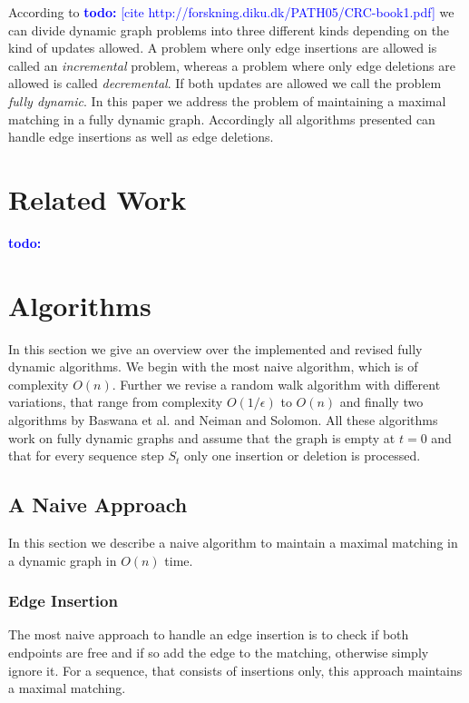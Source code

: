 \documentclass{article}      %
\newcommand\todo[1]{\textcolor{blue}{\textbf{todo: }#1}}
\begin{document}
According to \todo{[cite http://forskning.diku.dk/PATH05/CRC-book1.pdf]} we can divide dynamic graph problems into three different kinds depending on the kind of updates allowed. A problem where only edge insertions are allowed is called an \emph{incremental} problem, whereas a problem where only edge deletions are allowed is called \emph{decremental}. If both updates are allowed we call the problem \emph{fully dynamic}. In this paper we address the problem of maintaining a maximal matching in a fully dynamic graph. Accordingly all algorithms presented can handle edge insertions as well as edge deletions.

\pagebreak
\section{Related Work}
\label{sec:rel}

\todo{}

\pagebreak
\section{Algorithms}
\label{sec:algorithms}

In this section we give an overview over the implemented and revised fully dynamic algorithms. We begin with the most naive algorithm, which is of complexity $O(n)$. Further we revise a random walk algorithm with different variations, that range from complexity $O(1/\epsilon)$ to $O(n)$ and finally two algorithms by Baswana et al. and Neiman and Solomon. All these algorithms work on fully dynamic graphs and assume that the graph is empty at $t=0$ and that for every sequence step $S_t$ only one insertion or deletion is processed.

\subsection{A Naive Approach}
\label{sec:naive}

In this section we describe a naive algorithm to maintain a maximal matching in a dynamic graph in $O(n)$ time.

\subsubsection{Edge Insertion}
\label{sec:naive-edge-in}

The most naive approach to handle an edge insertion is to check if both endpoints are free and if so add the edge to the matching, otherwise simply ignore it. For a sequence, that consists of insertions only, this approach maintains a maximal matching.
\end{document}

